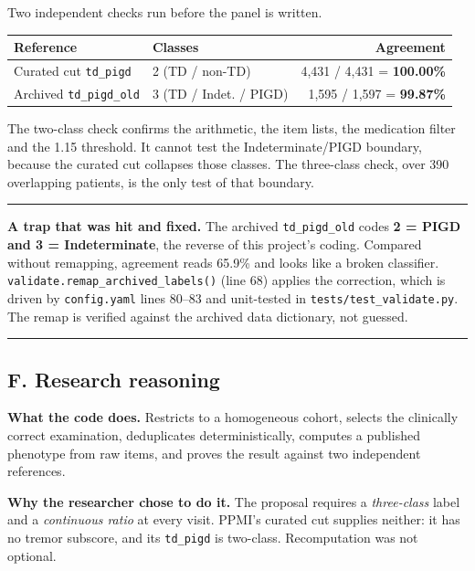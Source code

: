 \documentclass[11pt,a4paper]{article}
\newcommand{\code}[1]{\texttt{\small #1}}
\newenvironment{keypoint}
  {\begin{center}\begin{minipage}{0.95\textwidth}%
   \vspace{4pt}\hrule\vspace{7pt}\small}
  {\vspace{7pt}\hrule\vspace{4pt}\end{minipage}\end{center}}
\begin{document}
Two independent checks run before the panel is written.

\begin{table}[h]
\centering
\begin{tabular}{@{}llr@{}}
\toprule
\textbf{Reference} & \textbf{Classes} & \textbf{Agreement} \\
\midrule
Curated cut \code{td\_pigd}   & 2 (TD / non-TD)         & 4{,}431 / 4{,}431 = \textbf{100.00\%} \\
Archived \code{td\_pigd\_old} & 3 (TD / Indet. / PIGD)  & 1{,}595 / 1{,}597 = \textbf{99.87\%} \\
\bottomrule
\end{tabular}
\end{table}

\noindent
The two-class check confirms the arithmetic, the item lists, the medication
filter and the 1.15 threshold. It cannot test the Indeterminate/PIGD boundary,
because the curated cut collapses those classes. The three-class check, over
390 overlapping patients, is the only test of that boundary.

\begin{keypoint}
\textbf{A trap that was hit and fixed.} The archived \code{td\_pigd\_old} codes
\textbf{2 = PIGD and 3 = Indeterminate}, the reverse of this project's coding.
Compared without remapping, agreement reads 65.9\% and looks like a broken
classifier. \code{validate.remap\_archived\_labels()} (line 68) applies the
correction, which is driven by \code{config.yaml} lines 80--83 and unit-tested
in \code{tests/test\_validate.py}. The remap is verified against the archived
data dictionary, not guessed.
\end{keypoint}

\subsection{F. Research reasoning}

\textbf{What the code does.} Restricts to a homogeneous cohort, selects the
clinically correct examination, deduplicates deterministically, computes a
published phenotype from raw items, and proves the result against two
independent references.

\textbf{Why the researcher chose to do it.} The proposal requires a
\emph{three-class} label and a \emph{continuous ratio} at every visit. PPMI's
curated cut supplies neither: it has no tremor subscore, and its
\code{td\_pigd} is two-class. Recomputation was not optional.
\end{document}
